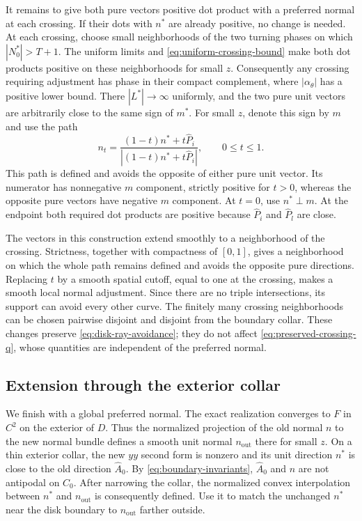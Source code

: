 It remains to give both pure vectors positive dot product with a
preferred normal at each crossing.  If their dots with $n^*$ are
already positive, no change is needed.  At each crossing, choose small
neighborhoods of the two turning phases on which $|N_0^*|>T+1$.
The uniform limits and \eqref{eq:uniform-crossing-bound} make both
dot products positive on these neighborhoods for small $z$.
Consequently any crossing requiring adjustment has phase in their
compact complement, where $|\alpha_\theta|$ has a positive lower bound.
There $|L^*|\to\infty$ uniformly, and the two pure unit vectors are
arbitrarily close to the same sign of $m^*$.
For small $z$, denote this sign by $m$ and use the path
\begin{equation}
 n_t=\frac{(1-t)n^*+t\widehat P_i}
 {|(1-t)n^*+t\widehat P_i|},\qquad 0\le t\le1.
 \label{eq:normal-crossing-path}
\end{equation}
This path is defined and avoids the opposite of either pure unit
vector.  Its numerator has nonnegative $m$ component, strictly positive
for $t>0$, whereas the opposite pure vectors have negative $m$
component.  At $t=0$, use $n^*\perp m$.
At the endpoint both required dot products are positive because
$\widehat P_i$ and $\widehat P_l$ are close.

The vectors in this construction extend smoothly to a neighborhood
of the crossing.  Strictness, together with compactness of $[0,1]$,
gives a neighborhood on which the whole path remains defined and
avoids the opposite pure directions.  Replacing $t$ by a smooth
spatial cutoff, equal to one at the crossing, makes a smooth local
normal adjustment.  Since there are no triple intersections, its
support can avoid every other curve.  The finitely many crossing
neighborhoods can be chosen pairwise disjoint and disjoint from the
boundary collar.  These changes preserve
\eqref{eq:disk-ray-avoidance}; they do not affect
\eqref{eq:preserved-crossing-q}, whose quantities are independent of
the preferred normal.

\subsection{Extension through the exterior collar}

We finish with a global preferred normal.  The exact realization
converges to $F$ in $C^2$ on the exterior of $D$.  Thus the normalized
projection of the old normal $n$ to the new normal bundle defines a
smooth unit normal $n_{\mathrm{out}}$ there for small $z$.
On a thin exterior collar, the new $yy$ second form is nonzero and
its unit direction $n^*$ is close to the old direction
$\widehat A_0$.  By \eqref{eq:boundary-invariants},
$\widehat A_0$ and $n$ are not antipodal on $C_0$.
After narrowing the collar, the normalized convex interpolation
between $n^*$ and $n_{\mathrm{out}}$ is consequently defined.
Use it to match the unchanged $n^*$ near the disk boundary to
$n_{\mathrm{out}}$ farther outside.


